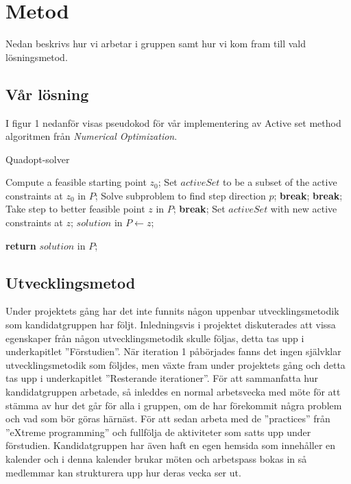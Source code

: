 \section{Metod}
Nedan beskrivs hur vi arbetar i gruppen samt hur vi kom fram till vald lösningsmetod. 

\subsection{Vår lösning}
I figur 1 nedanför visas pseudokod för vår implementering av Active set method algoritmen från \emph{Numerical Optimization}.

\begin{algorithm}[H]
\caption{Quadopt-solver}
\begin{algorithmic}
	\State Compute a feasible starting point $z_0$;
\EndIf	
\State Set $activeSet$ to be a subset of the active constraints at $z_0$ in $P$;
	\State Solve subproblem to find step direction $p$;
			\State \textbf{break};
		\EndIf		
			\State \textbf{break};
		\EndIf
	\Else
		\State Take step to better feasible point $z$ in $P$;
			\State \textbf{break};
		\EndIf
		\State Set $activeSet$ with new active constraints at $z$;	
	\EndIf
\EndWhile
\State  $solution$ in $P\gets z$;

\State \textbf{return} $solution$ in $P$;
	
\EndProcedure
\end{algorithmic}
\end{algorithm}



\subsection{Utvecklingsmetod}
Under projektets gång har det inte funnits någon uppenbar utvecklingsmetodik som kandidatgruppen har följt. Inledningsvis i projektet diskuterades att vissa egenskaper från någon utvecklingsmetodik skulle följas, detta tas upp i underkapitlet ''Förstudien''. När iteration 1 påbörjades fanns det ingen självklar utvecklingsmetodik som följdes, men växte fram under projektets gång och detta tas upp i underkapitlet ''Resterande iterationer''.
\newline
\newline
För att sammanfatta hur kandidatgruppen arbetade, så  inleddes en normal arbetsvecka med möte för att stämma av hur det går för alla i gruppen, om de har förekommit några problem och vad som bör göras härnäst. För att sedan arbeta med de ''practices'' från ''eXtreme programming'' och fullfölja de aktiviteter som satts upp under förstudien. 
\newline
\newline%
Kandidatgruppen har även haft en egen hemsida som innehåller en kalender och i denna kalender brukar möten och arbetspass bokas in så medlemmar kan strukturera upp hur deras vecka ser ut.


